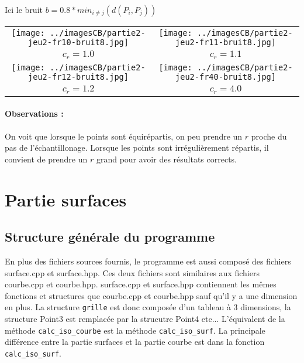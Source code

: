 \documentclass[11pt,a4paper]{article}
\begin{document}
\pagebreak

Ici le bruit $b=0.8*min_{i \neq j}(d(P_i,P_j))$
\begin{center}
\begin{tabular}{|c|c|}
\hline
\texttt{[image: ../imagesCB/partie2-jeu2-fr10-bruit8.jpg]} & \texttt{[image: ../imagesCB/partie2-jeu2-fr11-bruit8.jpg]} \\
$c_r=1.0$                                                             & $c_r=1.1$ \\
\hline
\texttt{[image: ../imagesCB/partie2-jeu2-fr12-bruit8.jpg]} & \texttt{[image: ../imagesCB/partie2-jeu2-fr40-bruit8.jpg]} \\
$c_r=1.2$                                                             & $c_r=4.0$ \\
\hline
\end{tabular}
\end{center}

\paragraph{Observations :}
On voit que lorsque le points sont équirépartis, on peu prendre un $r$ proche du pas de l'échantillonage. Lorsque les points sont irrégulièrement
répartis, il convient de prendre un $r$ grand pour avoir des résultats corrects.


\pagebreak

\section{Partie surfaces}
\subsection{Structure générale du programme}
En plus des fichiers sources fournis, le programme est aussi composé des fichiers surface.cpp et surface.hpp. Ces deux fichiers
sont similaires aux fichiers courbe.cpp et courbe.hpp. surface.cpp et surface.hpp contiennent les mêmes fonctions et structures que
courbe.cpp et courbe.hpp sauf qu'il y a une dimension en plus. La structure {\tt grille} est donc composée d'un tableau à 3 dimensions,
la structure Point3 est remplacée par la strucutre Point4 etc... L'équivalent de la méthode {\tt calc\_iso\_courbe} est la méthode
{\tt calc\_iso\_surf}. La principale différence entre la partie surfaces et la partie courbe est dans la fonction {\tt calc\_iso\_surf}.
\end{document}
